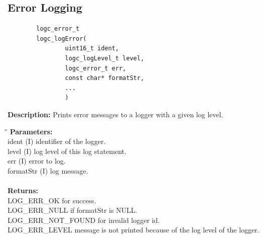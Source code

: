 \documentclass[a4paper, titlepage, 11pt]{article}
\begin{document}
\subsection{Error Logging}
\small
\begin{verbatim}
        logc_error_t
        logc_logError(
                uint16_t ident,
                logc_logLevel_t level,
                logc_error_t err,
                const char* formatStr,
                ...
                )
\end{verbatim}
\normalsize
\textbf{Description:} Prints error messages to a logger with a given log level.
\begin{tabbing}
\hspace*{1cm}\=\hspace*{2cm}\=\hspace*{0,6cm}\= \kill
\textbf{Parameters:} \\
\> ident \> (I) identifier of the logger. \\
\> level \> (I) log level of this log statement. \\
\> err \> (I) error to log. \\
\> formatStr \> (I) log message. \\ \\
\textbf{Returns:} \\
\> LOG\_ERR\_OK for success. \\
\> LOG\_ERR\_NULL if formatStr is NULL. \\
\> LOG\_ERR\_NOT\_FOUND for invalid logger id. \\
\> LOG\_ERR\_LEVEL message is not printed because of the log level of the logger. \\
\end{tabbing}

\newpage
\end{document}
